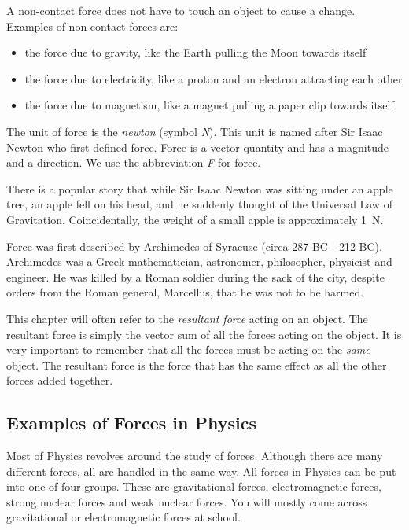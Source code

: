 A non-contact force does not have to touch an object to cause a change. Examples of non-contact forces are:
\begin{itemize}
\item the force due to gravity, like the Earth pulling the Moon towards itself
\item the force due to electricity, like a proton and an electron attracting each other
\item the force due to magnetism, like a magnet pulling a paper clip towards itself
\end{itemize}

The unit of force is the \emph{newton} (symbol \emph{N}). This unit is named after Sir Isaac Newton who first defined force. Force is a vector quantity and has a magnitude and a direction. We use the abbreviation \emph{F} for force.

\begin{IFact}{There is a popular story that while Sir Isaac Newton was sitting under an apple tree, an apple fell on his head, and he suddenly thought of the Universal Law of Gravitation. Coincidentally, the weight of a small apple is approximately 1~N.}\end{IFact}

\begin{IFact}{Force was first described by Archimedes of Syracuse (circa 287 BC - 212 BC). Archimedes was a Greek mathematician, astronomer, philosopher, physicist and engineer. He was killed by a Roman soldier during the sack of the city, despite orders from the Roman general, Marcellus, that he was not to be harmed.}
\end{IFact}

This chapter will often refer to the \emph{resultant force} acting on an object. The resultant force is simply the vector sum of all the forces acting on the object. It is very important to remember that all the forces must be acting on the \emph{same} object. The resultant force is the force that has the same effect as all the other forces added together.

\subsection{Examples of Forces in Physics}
Most of Physics revolves around the study of forces. Although there are many different forces, all are handled in the same way. All forces in Physics can be put into one of four groups. These are gravitational forces, electromagnetic forces, strong nuclear forces and weak nuclear forces. You will mostly come across gravitational or electromagnetic forces at school.

